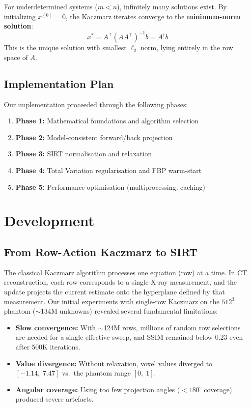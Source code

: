 \documentclass[11pt,a4paper]{article}
\begin{document}
For underdetermined systems ($m < n$), infinitely many solutions exist. By initializing $x^{(0)} = 0$, the Kaczmarz iterates converge to the \textbf{minimum-norm solution}:
\begin{equation}
    x^* = A^\top(AA^\top)^{-1}b = A^\dagger b
\end{equation}
This is the unique solution with smallest $\ell_2$ norm, lying entirely in the row space of $A$.

\subsection{Implementation Plan}

Our implementation proceeded through the following phases:
\begin{enumerate}
    \item \textbf{Phase 1:} Mathematical foundations and algorithm selection
    \item \textbf{Phase 2:} Model-consistent forward/back projection
    \item \textbf{Phase 3:} SIRT normalisation and relaxation
    \item \textbf{Phase 4:} Total Variation regularisation and FBP warm-start
    \item \textbf{Phase 5:} Performance optimisation (multiprocessing, caching)
\end{enumerate}

\section{Development}

\subsection{From Row-Action Kaczmarz to SIRT}

The classical Kaczmarz algorithm processes one equation (row) at a time.  In CT reconstruction, each row corresponds to a single X-ray measurement, and the update projects the current estimate onto the hyperplane defined by that measurement.  Our initial experiments with single-row Kaczmarz on the $512^3$ phantom ($\sim$134M unknowns) revealed several fundamental limitations:

\begin{itemize}
    \item \textbf{Slow convergence:} With $\sim$124M rows, millions of random row selections are needed for a single effective sweep, and SSIM remained below 0.23 even after 500K iterations.
    \item \textbf{Value divergence:} Without relaxation, voxel values diverged to $[-1.14,\;7.47]$ vs.\ the phantom range $[0,\;1]$.
    \item \textbf{Angular coverage:} Using too few projection angles ($< 180^\circ$ coverage) produced severe artefacts.
\end{itemize}
\end{document}
